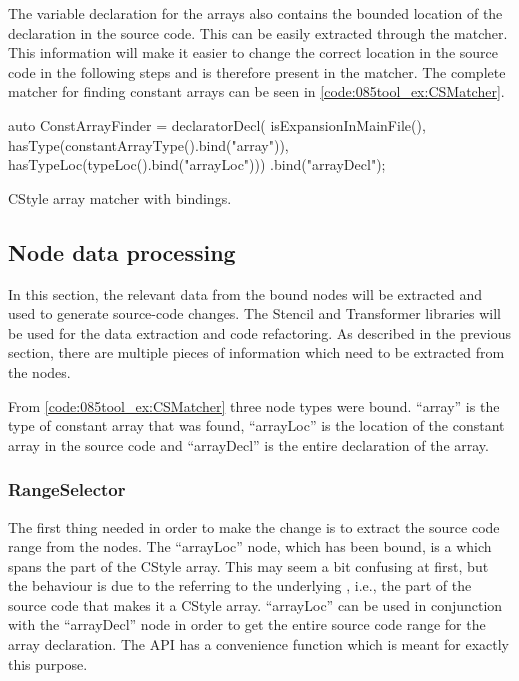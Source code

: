 The variable declaration for the arrays also contains the bounded location of the declaration in the source code. This can be easily extracted through the  matcher. This information will make it easier to change the correct location in the source code in the following steps and is therefore present in the matcher.
The complete matcher for finding constant arrays can be seen in \cref{code:085tool_ex:CSMatcher}.

\begin{listing}[H]
    \begin{cppcode}
auto ConstArrayFinder = 
    declaratorDecl(
        isExpansionInMainFile(),
        hasType(constantArrayType().bind("array")),
        hasTypeLoc(typeLoc().bind("arrayLoc")))
    .bind("arrayDecl");
    \end{cppcode}
    \caption{CStyle array matcher with bindings.}
    \label{code:085tool_ex:CSMatcher}
\end{listing}

\subsection{Node data processing}

In this section, the relevant data from the bound nodes will be extracted and used to generate source-code changes. The Stencil and Transformer libraries will be used for the data extraction and code refactoring.
As described in the previous section, there are multiple pieces of information which need to be extracted from the nodes. 

From \cref{code:085tool_ex:CSMatcher} three node types were bound. ``array'' is the type of constant array that was found, ``arrayLoc'' is the location of the constant array in the source code and ``arrayDecl'' is the entire declaration of the array.

\subsubsection*{RangeSelector}
The first thing needed in order to make the change is to extract the source code range from the nodes. The ``arrayLoc'' node, which has been bound, is a  which spans the  part of the CStyle array.
This may seem a bit confusing at first, but the behaviour is due to the  referring to the underlying , i.e., the part of the source code that makes it a CStyle array.
``arrayLoc'' can be used in conjunction with the ``arrayDecl'' node in order to get the entire source code range for the array declaration. The  API has a convenience function  which is meant for exactly this purpose.

